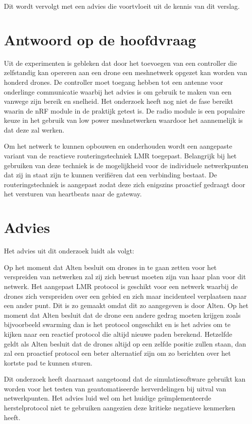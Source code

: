 \documentclass[a4paper, 11pt, oneside]{report}
\begin{document}
Dit wordt vervolgt met een advies die voortvloeit uit de kennis van dit verslag.

\section{Antwoord op de hoofdvraag}

Uit de experimenten is gebleken dat door het toevoegen van een controller die zelfstandig kan opereren aan een drone een meshnetwerk opgezet kan worden van honderd drones. De controller moet toegang hebben tot een antenne voor onderlinge communicatie waarbij het advies is om gebruik te maken van een  vanwege zijn bereik en snelheid. Het onderzoek heeft nog niet de fase bereikt waarin de nRF module in de praktijk getest is. De radio module is een populaire keuze in het gebruik van low power meshnetwerken waardoor het aannemelijk is dat deze zal werken.

Om het netwerk te kunnen opbouwen en onderhouden wordt een aangepaste variant van de reactieve routeringstechniek LMR toegepast. Belangrijk bij het gebruiken van deze techniek is de mogelijkheid voor de individuele netwerkpunten dat zij in staat zijn te kunnen verifiëren dat een verbinding bestaat. De routeringstechniek is aangepast zodat deze zich enigszins proactief gedraagt door het versturen van heartbeats naar de gateway. 

\section{Advies}
Het advies uit dit onderzoek luidt als volgt:

Op het moment dat Alten besluit om drones in te gaan zetten voor het verspreiden van netwerken zal zij zich bewust moeten zijn van haar plan voor dit netwerk.
Het aangepast LMR protocol is geschikt voor een netwerk waarbij de drones zich verspreiden over een gebied en zich maar incidenteel verplaatsen naar een ander punt.
Dit is zo gemaakt omdat dit zo aangegeven is door Alten.
Op het moment dat Alten besluit dat de drone een andere gedrag moeten krijgen zoals bijvoorbeeld swarming dan is het protocol ongeschikt en is het advies om te kijken naar een reactief protocol die altijd nieuwe paden berekend.
Hetzelfde geldt als Alten besluit dat de drones altijd op een zelfde positie zullen staan, dan zal een proactief protocol een beter alternatief zijn om zo berichten over het kortste pad te kunnen sturen.    

Dit onderzoek heeft daarnaast aangetoond dat de simulatiesoftware gebruikt kan worden voor het testen van geautomatiseerde herverdelingen bij uitval van netwerkpunten. Het advies luid wel om het huidige geïmplementeerde herstelprotocol niet te gebruiken aangezien deze kritieke negatieve kenmerken heeft. 
\end{document}
